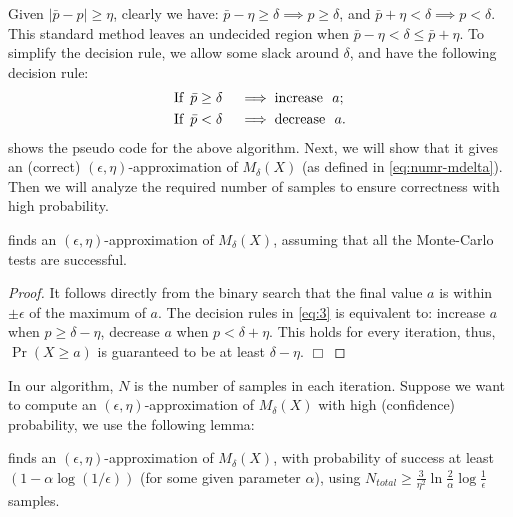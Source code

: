Given $|\bar p - p| \geq \eta$, clearly we have: $\bar p - \eta \geq \delta \implies
p \geq \delta$, and $\bar p + \eta < \delta \implies p < \delta$. This standard method leaves
an undecided region when $\bar p - \eta < \delta \leq \bar p + \eta$. To simplify the decision
rule, we allow some slack around $\delta$, and have the following decision rule:
\begin{align}
\begin{aligned} \label{eq:3}
  & \text{If} \enskip \bar p  \geq \delta && \implies \text{increase} \,\,\,\, a; \\
  & \text{If} \enskip \bar p < \delta && \implies \text{decrease} \,\,\,\, a.
\end{aligned}
\end{align}
%
 shows the pseudo code for the above  algorithm. Next, we will show that it gives an (correct)
 $(\epsilon, \eta)$-approximation of  $M_{\delta}(X)$ (as defined in \ref{eq:numr-mdelta}). Then we will analyze the required number of samples to ensure correctness with high probability.
%
\begin{lemma}
\label{lem:ee-aprox}
 finds an  $(\epsilon, \eta)$-approximation of  $M_{\delta}(X)$, assuming that all the Monte-Carlo tests are successful.
\end{lemma}
\begin{proof}
It follows directly from the binary
search that the final value $a$ is within $\pm \epsilon$ of the maximum of $a$. The decision rules
in \cref{eq:3} is equivalent to: increase $a$ when $p \geq \delta - \eta$, decrease $a$ when
$p < \delta + \eta$. This holds for every iteration, thus, $\Pr(X \geq a)$ is guaranteed to be
at least $\delta - \eta$. $\Box$
\end{proof}
%
In our algorithm, $N$ is the number of samples in each iteration. Suppose we want to compute an
$(\epsilon, \eta)$-approximation of  $M_{\delta}(X)$ with  high (confidence) probability, we use the following lemma:
\begin{lemma}
\label{lem:num-samples}
 finds an $(\epsilon, \eta)$-approximation of $M_{\delta}(X)$, with probability of success  at least
$(1 - \alpha \log(1/\epsilon))$ (for some given parameter $\alpha$), using 
$N_{\mathit{total}} \geq \frac{3}{\eta^2}\ln{\frac{2}{\alpha}} \log{\frac{1}{\epsilon}}$ samples.
\end{lemma}
